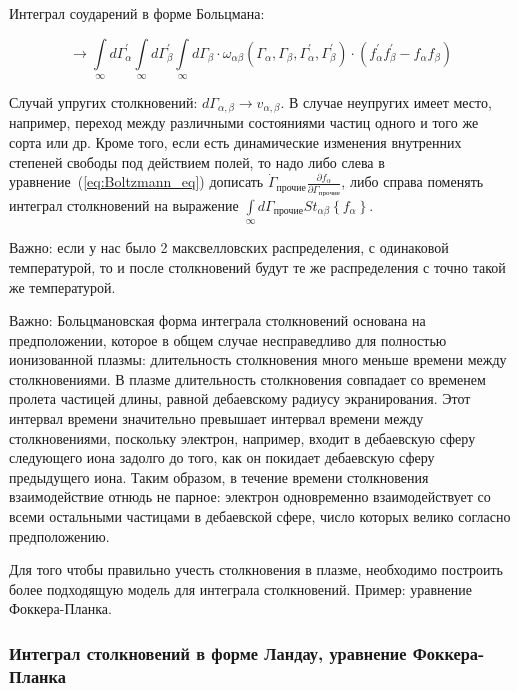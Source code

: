 \documentclass[10pt, a4paper]{article}
\begin{document}
Интеграл соударений в форме Больцмана:

\begin{equation} \label{eq:Boltzmann_collision_term}
	\rightarrow \int\limits_{\infty}d\Gamma_\alpha^{'} \int\limits_{\infty}d\Gamma_\beta^{'} \int\limits_{\infty}d\Gamma_\beta \cdot \omega_{\alpha\beta}\left(\Gamma_\alpha, \Gamma_\beta, \Gamma_\alpha^{'}, \Gamma_\beta^{'}\right) \cdot (f_{\alpha}^{'}f_{\beta}^{'}-f_{\alpha}f_{\beta})
\end{equation}

Случай упругих столкновений: $d\Gamma_{\alpha, \beta}\rightarrow v_{\alpha, \beta}$. В случае неупругих имеет место, например, переход между различными состояниями частиц одного и того же сорта или др. Кроме того, если есть динамические изменения внутренних степеней свободы под действием полей, то надо либо слева в уравнение~(\ref{eq:Boltzmann_eq}) дописать $\dot{\Gamma}_{\text{прочие}}\frac{\partial f_\alpha}{\partial \Gamma_{\text{прочие}}}$, либо справа поменять интеграл столкновений на выражение $\int\limits_{\infty}d\Gamma_{\text{прочие}}St_{\alpha\beta}\left\lbrace f_\alpha\right\rbrace$.

Важно: если у нас было 2 максвелловских распределения, с одинаковой температурой, то и после столкновений будут те же распределения с точно такой же температурой. 

Важно: Больцмановская форма интеграла столкновений основана на предположении, которое в общем случае несправедливо для полностью ионизованной плазмы: длительность столкновения много меньше времени между столкновениями. В плазме длительность столкновения совпадает со временем пролета частицей длины, равной дебаевскому радиусу экранирования. Этот интервал времени значительно превышает интервал времени между столкновениями, поскольку электрон, например, входит в дебаевскую сферу следующего иона задолго до того, как он покидает дебаевскую сферу предыдущего иона. Таким образом, в течение времени столкновения взаимодействие отнюдь не парное: электрон одновременно взаимодействует со всеми остальными частицами в дебаевской сфере, число которых велико согласно предположению.

Для того чтобы правильно учесть столкновения в плазме, необходимо построить более подходящую модель для интеграла столкновений. Пример: уравнение Фоккера-Планка.

\subsubsection{Интеграл столкновений в форме Ландау, уравнение Фоккера-Планка}
\end{document}
